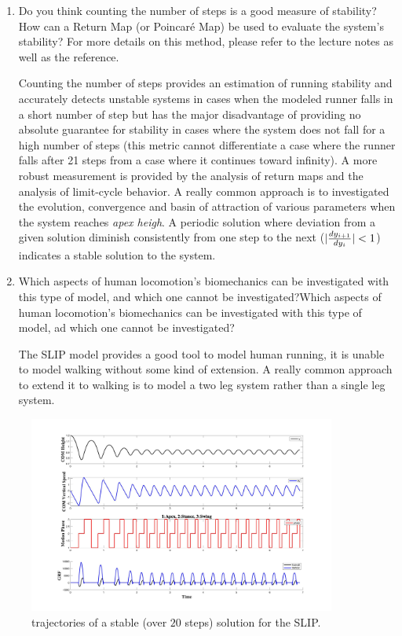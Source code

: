 \documentclass[11pt]{article}
\DeclarePairedDelimiter\abs{\lvert}{\rvert}%
\begin{document}
\begin{enumerate}
    \item Do you think counting the number of steps is a good measure of stability? How can a Return Map (or Poincaré Map) be used to evaluate the system's stability? For more details on this method, please refer to the lecture notes as well as the reference.
    \begin{adjustwidth}{0.5cm}{}
        Counting the number of steps provides an estimation of running stability and accurately detects unstable systems in cases when the modeled runner falls in a short number of step but has the major disadvantage of providing no absolute guarantee for stability in cases where the system does not fall for a high number of steps (this metric cannot differentiate a case where the runner falls after 21 steps from a case where it continues toward infinity). 
        \BlankLine
        A more robust measurement is provided by the analysis of return maps and the analysis of limit-cycle behavior. A really common approach is to investigated the evolution, convergence and basin of attraction of various parameters when the system reaches \textit{apex heigh}. A periodic solution where deviation from a given solution diminish consistently from one step to the next ($\abs{\frac{dy_{i+1}}{dy_{i}}} < 1$) indicates a stable solution to the system.
        \[  \]
    \end{adjustwidth}

    \item Which aspects of human locomotion's biomechanics can be investigated with this type of model, and which one cannot be investigated?Which aspects of human locomotion's biomechanics can be investigated with this type of model, ad which one cannot be investigated?
    \begin{adjustwidth}{0.5cm}{}
        The SLIP model provides a good tool to model human running, it is unable to model walking without some kind of extension. A really common approach to extend it to walking is to model a two leg system rather than a single leg system. 
    \end{adjustwidth}
\end{enumerate}

\begin{figure}[h!]
    \centering
    \includegraphics[width=0.9\textwidth]{screens/run_1.jpg}
    \caption{trajectories of a stable (over $20$ steps) solution for the SLIP.}
\end{figure}
\end{document}
